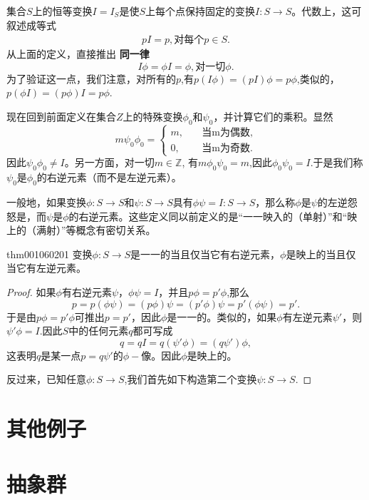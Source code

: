 集合$S$上的恒等变换$I = I_{S}$是使$S$上每个点保持固定的变换$I:S \to S$。代数上，这可叙述成等式
\begin{gather}\label{equ001060203}
pI = p, \text{对每个}p \in S.
\end{gather}
从上面的定义，直接推出
\textbf{同一律}
\[
I\phi = \phi{}I = \phi, \text{对一切}\phi.
\]
为了验证这一点，我们注意，对所有的$p$,有$p(I\phi) = (pI)\phi = p\phi$,类似的，$p(\phi{}I) = (p\phi)I = p\phi$.

现在回到前面定义在集合$Z$上的特殊变换$\phi_0$和$\psi_0$，并计算它们的乘积。显然
\[
m\psi_0\phi_0 = \left\{
\begin{aligned}
m, &\quad \text{当m为偶数},\\
0, &\quad \text{当m为奇数}.
\end{aligned}
\right.
\]
因此$\psi_0\phi_0 \neq I$。另一方面，对一切$m \in \mathbb{Z}$, 有$m\phi_0\psi_0 = m$,因此$\phi_0\psi_0 = I$.于是我们称$\psi_0$是$\phi_0$的右逆元素（而不是左逆元素）。

一般地，如果变换$\phi:S \to S$和$\psi:S \to S$具有$\phi\psi = I: S \to S$，那么称$\phi$是$\psi$的左逆怨怒是，而$\psi$是$\phi$的右逆元素。这些定义同以前定义的是“一一映入的（单射）”和“映上的（满射）”等概念有密切关系。

\begin{theorem}{}{thm001060201}
变换$\phi:S \to S$是一一的当且仅当它有右逆元素，$\phi$是映上的当且仅当它有左逆元素。
\end{theorem}

\begin{proof}
如果$\phi$有右逆元素$\psi$，$\phi\psi = I$，并且$p\phi = p'\phi$,那么
\[
p = p(\phi\psi) = (p\phi)\psi = (p'\phi)\psi = p'(\phi\psi) = p'.
\]
于是由$p\phi = p'\phi$可推出$p=p'$，因此$\phi$是一一的。类似的，如果$\phi$有左逆元素$\psi'$，则$\psi'\phi = I$.因此$S$中的任何元素$q$都可写成
\[
q = qI = q(\psi'\phi) = (q\psi')\phi,
\]
这表明$q$是某一点$p = q\psi'$的$\phi-$像。因此$\phi$是映上的。

反过来，已知任意$\phi:S \to S$,我们首先如下构造第二个变换$\psi:S \to S$.
\end{proof}

\section{其他例子}\label{section0010603}



\section{抽象群}\label{section0010604}



